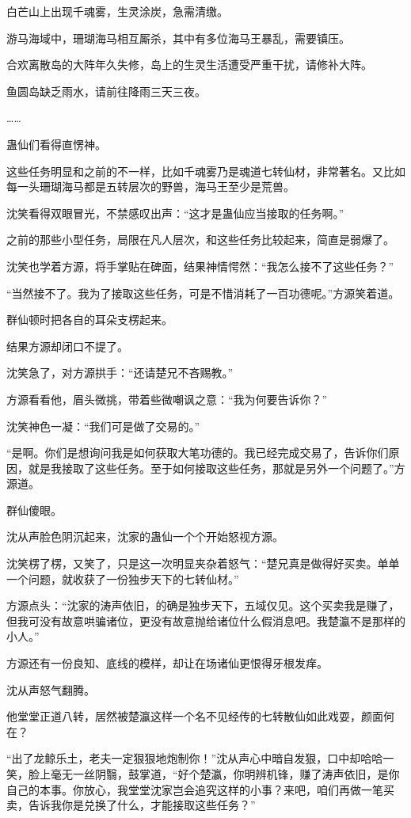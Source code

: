 \begin{this_body}
白芒山上出现千魂雾，生灵涂炭，急需清缴。

游马海域中，珊瑚海马相互厮杀，其中有多位海马王暴乱，需要镇压。

合欢离散岛的大阵年久失修，岛上的生灵生活遭受严重干扰，请修补大阵。

鱼圆岛缺乏雨水，请前往降雨三天三夜。

……

蛊仙们看得直愣神。

这些任务明显和之前的不一样，比如千魂雾乃是魂道七转仙材，非常著名。又比如每一头珊瑚海马都是五转层次的野兽，海马王至少是荒兽。

沈笑看得双眼冒光，不禁感叹出声：“这才是蛊仙应当接取的任务啊。”

之前的那些小型任务，局限在凡人层次，和这些任务比较起来，简直是弱爆了。

沈笑也学着方源，将手掌贴在碑面，结果神情愕然：“我怎么接不了这些任务？”

“当然接不了。我为了接取这些任务，可是不惜消耗了一百功德呢。”方源笑着道。

群仙顿时把各自的耳朵支楞起来。

结果方源却闭口不提了。

沈笑急了，对方源拱手：“还请楚兄不吝赐教。”

方源看看他，眉头微挑，带着些微嘲讽之意：“我为何要告诉你？”

沈笑神色一凝：“我们可是做了交易的。”

“是啊。你们是想询问我是如何获取大笔功德的。我已经完成交易了，告诉你们原因，就是我接取了这些任务。至于如何接取这些任务，那就是另外一个问题了。”方源道。

群仙傻眼。

沈从声脸色阴沉起来，沈家的蛊仙一个个开始怒视方源。

沈笑楞了楞，又笑了，只是这一次明显夹杂着怒气：“楚兄真是做得好买卖。单单一个问题，就收获了一份独步天下的七转仙材。”

方源点头：“沈家的涛声依旧，的确是独步天下，五域仅见。这个买卖我是赚了，但我可没有故意哄骗诸位，更没有故意抛给诸位什么假消息吧。我楚瀛不是那样的小人。”

方源还有一份良知、底线的模样，却让在场诸仙更恨得牙根发痒。

沈从声怒气翻腾。

他堂堂正道八转，居然被楚瀛这样一个名不见经传的七转散仙如此戏耍，颜面何在？

“出了龙鲸乐土，老夫一定狠狠地炮制你！”沈从声心中暗自发狠，口中却哈哈一笑，脸上毫无一丝阴翳，鼓掌道，“好个楚瀛，你明辨机锋，赚了涛声依旧，是你自己的本事。你放心，我堂堂沈家岂会追究这样的小事？来吧，咱们再做一笔买卖，告诉我你是兑换了什么，才能接取这些任务？”


\end{this_body}
